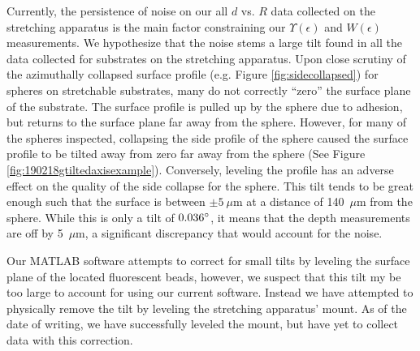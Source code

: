 Currently, the persistence of noise on our all $ d $ vs. $ R $ data collected on the stretching apparatus is the main factor constraining our $ \Upsilon(\epsilon) $ and $ W(\epsilon) $ measurements. We hypothesize that the noise stems a large tilt found in all the data collected for substrates on the stretching apparatus. Upon close scrutiny of the azimuthally collapsed surface profile (e.g. Figure \ref{fig:sidecollapsed}) for spheres on stretchable substrates, many do not correctly ``zero'' the surface plane of the substrate. The surface profile is pulled up by the sphere due to adhesion, but returns to the surface plane far away from the sphere. However, for many of the spheres inspected, collapsing the side profile of the sphere caused the surface profile to be tilted away from zero far away from the sphere (See Figure \ref{fig:190218gtiltedaxisexample}). Conversely, leveling the profile has an adverse effect on the quality of the side collapse for the sphere. This tilt tends to be great enough such that the surface is between $ \pm 5~\mu$m at a distance of 140~$ \mu $m from the sphere. While this is only a tilt of $ 0.036 \degree $, it means that the depth measurements are off by 5~$ \mu $m, a significant discrepancy that would account for the noise.

Our MATLAB software attempts to correct for small tilts by leveling the surface plane of the located fluorescent beads, however, we suspect that this tilt my be too large to account for using our current software. Instead we have attempted to physically remove the tilt by leveling the stretching apparatus' mount. As of the date of writing, we have successfully leveled the mount, but have yet to collect data with this correction. 
